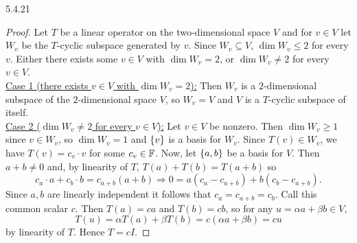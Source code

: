 \documentclass{exam}
\begin{document}
  \begin{problem}{5.4.21}
    \begin{proof}
      Let $T$ be a linear operator on the two-dimensional space $V$ and for $v \in V$ let $W_v$ be the $T$-cyclic subspace generated by $v$. Since $W_v \subseteq V$, $\dim W_v \leq 2$ for every $v$. Either there exists some $v \in V$ with $\dim W_v = 2$, or $\dim W_v \neq 2$ for every $v \in V$. \\
      \underline{Case 1 (there exists $v \in V$ with $\dim W_v = 2$):} Then $W_v$ is a $2$-dimensional subspace of the $2$-dimensional space $V$, so $W_v = V$ and $V$ is a $T$-cyclic subspace of itself. \\
      \underline{Case 2 ($\dim W_v \neq 2$ for every $v \in V$):} Let $v \in V$ be nonzero. Then $\dim W_v \geq 1$ since $v \in W_v$, so $\dim W_v = 1$ and $\left\{v \right\}$ is a basis for $W_v$. Since $T(v) \in W_v$, we have $T(v) = c_v \cdot v$ for some $c_v \in \mathbb F$. Now, let $\left\{a, b \right\}$ be a basis for $V$. Then $a + b \neq 0$ and, by linearity of $T$, $T(a) + T(b) = T(a + b)$ so
      \[
        c_a \cdot a + c_b \cdot b = c_{a + b}(a + b) \Rightarrow 0 = a(c_a - c_{a + b}) + b(c_b - c_{a + b}).
      \]
      Since $a, b$ are linearly independent it follows that $c_a = c_{a + b} = c_b$. Call this common scalar $c$. Then $T(a) = ca$ and $T(b) = cb$, so for any $u = \alpha a + \beta b \in V$, 
      \[
        T(u) = \alpha T(a) + \beta T(b) = c(\alpha a + \beta b) = cu
      \]
      by linearity of $T$. Hence $T = cI$.
    \end{proof}
  \end{problem}
\end{document}
